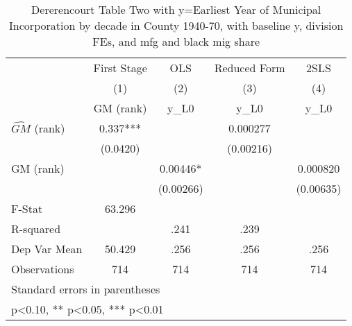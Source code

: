 \begin{table}[htbp]\centering
\def\sym#1{\ifmmode^{#1}\else\(^{#1}\)\fi}
\caption{Dererencourt Table Two with y=Earliest Year of Municipal Incorporation by decade in County 1940-70, with baseline y, division FEs, and mfg and black mig share}
\begin{tabular}{l*{4}{c}}
\toprule
                    & First Stage   &         OLS   &Reduced Form   &        2SLS   \\
                    &\multicolumn{1}{c}{(1)}&\multicolumn{1}{c}{(2)}&\multicolumn{1}{c}{(3)}&\multicolumn{1}{c}{(4)}\\
                    &\multicolumn{1}{c}{GM  (rank)}&\multicolumn{1}{c}{y\_L0}&\multicolumn{1}{c}{y\_L0}&\multicolumn{1}{c}{y\_L0}\\
\midrule
$\hat{GM}$ (rank)   &       0.337***&               &    0.000277   &               \\
                    &    (0.0420)   &               &   (0.00216)   &               \\
\addlinespace
GM  (rank)          &               &     0.00446*  &               &    0.000820   \\
                    &               &   (0.00266)   &               &   (0.00635)   \\
\midrule
F-Stat              &      63.296   &               &               &               \\
R-squared           &               &        .241   &        .239   &               \\
Dep Var Mean        &      50.429   &        .256   &        .256   &        .256   \\
Observations        &         714   &         714   &         714   &         714   \\
\bottomrule
\multicolumn{5}{l}{\footnotesize Standard errors in parentheses}\\
\multicolumn{5}{l}{\footnotesize * p<0.10, ** p<0.05, *** p<0.01}\\
\end{tabular}
\end{table}
